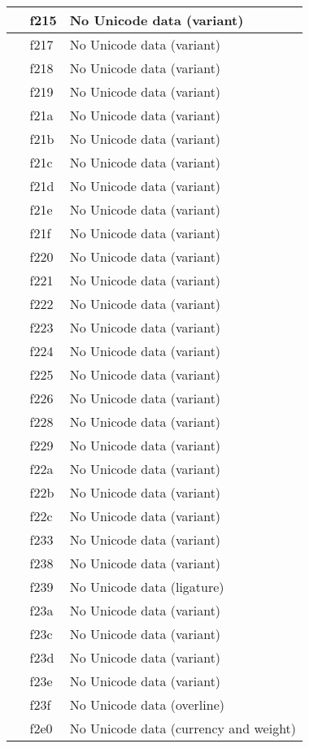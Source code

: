 \documentclass[12pt,letterpaper,openany]{book}
\begin{document}
\begin{center}
\begin{supertabular}{|m{0.25in}|m{0.5in}|m{4in}|}
 & f215 & No Unicode data (variant)\\\hline
 & f217 & No Unicode data (variant)\\\hline
 & f218 & No Unicode data (variant)\\\hline
 & f219 & No Unicode data (variant)\\\hline
 & f21a & No Unicode data (variant)\\\hline
 & f21b & No Unicode data (variant)\\\hline
 & f21c & No Unicode data (variant)\\\hline
 & f21d & No Unicode data (variant)\\\hline
 & f21e & No Unicode data (variant)\\\hline
 & f21f & No Unicode data (variant)\\\hline
 & f220 & No Unicode data (variant)\\\hline
 & f221 & No Unicode data (variant)\\\hline
 & f222 & No Unicode data (variant)\\\hline
 & f223 & No Unicode data (variant)\\\hline
 & f224 & No Unicode data (variant)\\\hline
 & f225 & No Unicode data (variant)\\\hline
 & f226 & No Unicode data (variant)\\\hline
 & f228 & No Unicode data (variant)\\\hline
 & f229 & No Unicode data (variant)\\\hline
 & f22a & No Unicode data (variant)\\\hline
 & f22b & No Unicode data (variant)\\\hline
 & f22c & No Unicode data (variant)\\\hline
 & f233 & No Unicode data (variant)\\\hline
 & f238 & No Unicode data (variant)\\\hline
 & f239 & No Unicode data (ligature)\\\hline
 & f23a & No Unicode data (variant)\\\hline
 & f23c & No Unicode data (variant)\\\hline
 & f23d & No Unicode data (variant)\\\hline
 & f23e & No Unicode data (variant)\\\hline
 & f23f & No Unicode data (overline)\\\hline
 & f2e0 & No Unicode data (currency and weight)\\\hline

\end{supertabular}
\end{center}
\end{document}
